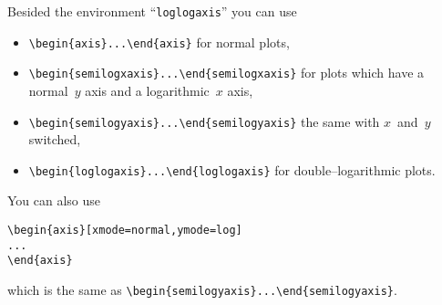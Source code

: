 \noindent
Besided the environment ``\texttt{loglogaxis}'' you can use
\begin{itemize}
	\item \lstinline!\begin{axis}...\end{axis}! for normal plots,
	\item \lstinline!\begin{semilogxaxis}...\end{semilogxaxis}! for plots which have a normal~$y$ axis and a logarithmic~$x$ axis,
	\item \lstinline!\begin{semilogyaxis}...\end{semilogyaxis}! the same with $x$~and~$y$ switched,
	\item \lstinline!\begin{loglogaxis}...\end{loglogaxis}! for double--logarithmic plots.
\end{itemize}
You can also use
\begin{lstlisting}
\begin{axis}[xmode=normal,ymode=log]
...
\end{axis}
\end{lstlisting}
which is the same as \lstinline!\begin{semilogyaxis}...\end{semilogyaxis}!.
\begin{codeexample}[]
%
\end{codeexample}

